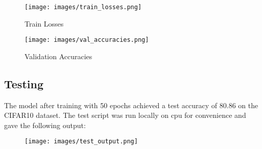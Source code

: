 \documentclass{ETHExercise}
\begin{document}
\begin{figure}[h]
  \centering
  \texttt{[image: images/train\_losses.png]}
  \caption{Train Losses}
\end{figure}
\begin{figure}[h]
  \centering
  \texttt{[image: images/val\_accuracies.png]}
  \caption{Validation Accuracies}
\end{figure}

\subsection{Testing}
The model after training with 50 epochs achieved a test accuracy of 80.86 on the CIFAR10 dataset.
The test script was run locally on cpu for convenience and gave the following output:
\begin{figure}[!h]
  \centering
  \texttt{[image: images/test\_output.png]}
\end{figure}
\end{document}
